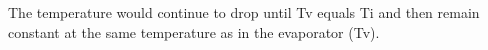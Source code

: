 The temperature would continue to drop until Tv equals Ti and then remain constant at the same temperature as in the evaporator (Tv).